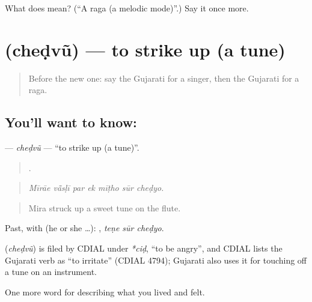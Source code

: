 \begin{tcolorbox}[breakable,colback=teal!4,colframe=teal!35!black,title={Before you move on}]
What does  mean? (\textquotedblleft{}A raga (a melodic mode)\textquotedblright{}.) Say it once more.
\end{tcolorbox}
\section[\texorpdfstring{\gu{છેડવું} (cheḍvũ)}{છેડવું (cheḍvũ)}]{ (cheḍvũ) — to strike up (a tune)}

\label{lesson:GU-C526-chedvu}



\begin{quote}
Before the new one: say the Gujarati for a singer, then the Gujarati for a raga.
\end{quote}

\subsection*{You'll want to know: }
\textbf{} — \emph{cheḍvũ} — \textquotedblleft{}to strike up (a tune)\textquotedblright{}.

\begin{quote}
      .
\end{quote}

\begin{quote}
\emph{Mīrāe vā̃sḷī par ek mīṭho sūr cheḍyo.}
\end{quote}

\begin{quote}
Mira struck up a sweet tune on the flute.
\end{quote}

Past, with  (he or she …):   , \emph{teṇe sūr cheḍyo}.

\begin{cousinweb}
\textbf{} (\emph{cheḍvũ}) is filed by CDIAL under \emph{*ciḍ}, \textquotedblleft{}to be angry\textquotedblright{}, and CDIAL lists the Gujarati verb as \textquotedblleft{}to irritate\textquotedblright{} (CDIAL 4794); Gujarati also uses it for touching off a tune on an instrument.
\end{cousinweb}

\begin{grammarlens}[title={What you've built}]
One more word for describing what you lived and felt.
\end{grammarlens}

